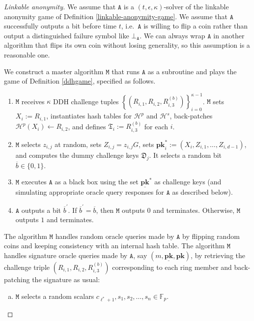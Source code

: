 \documentclass[draft]{llncs} %
\begin{document}
\begin{proof}[Linkable anonymity]
We assume that $\texttt{A}$ is a $(t, \epsilon, \kappa)$-solver of the linkable anonymity game of Definition \ref{linkable-anonymity-game}. We assume that $\texttt{A}$ successfully outputs a bit before time $t$, i.e.\ $\texttt{A}$ is willing to flip a coin rather than output a distinguished failure symbol like $\bot_{\texttt{A}}$. We can always wrap $\texttt{A}$ in another algorithm that flips its own coin without losing generality, so this assumption is a reasonable one.

We construct a master algorithm $\texttt{M}$ that runs $\texttt{A}$ as a subroutine and plays the game of Definition \ref{ddhgame}, specified as follows.

\begin{enumerate}
\item $\texttt{M}$ receives $\kappa$ DDH challenge tuples $\left\{(R_{i,1}, R_{i,2}, R_{i,3}^{(b)})\right\}_{i=0}^{\kappa - 1}$. $\texttt{M}$ sets $X_i := R_{i,1}$, instantiates hash tables for $\mathcal{H}^p$ and $\mathcal{H}^s$, back-patches $\mathcal{H}^p(X_i) \leftarrow R_{i,2}$, and defines $\mathfrak{T}_{i} := R_{i, 3}^{(b)}$ for each $i$.

\item $\texttt{M}$ selects $z_{i,j}$ at random, sets $Z_{i,j} = z_{i,j} G$, sets $\textbf{pk}_i^* := (X_i, Z_{i,1}, \ldots, Z_{i,d-1})$, and computes the dummy challenge keys $\mathfrak{D}_j$. It selects a random bit $\overline{b} \in \{0,1\}$.

\item $\texttt{M}$ executes $\texttt{A}$ as a black box using the set $\underline{\textbf{pk}}^*$ as challenge keys (and simulating appropriate oracle query responses for $\texttt{A}$ as described below).

\item $\texttt{A}$ outputs a bit $\overline{b}^\prime$. If $\overline{b}^\prime = \overline{b}$, then $\texttt{M}$ outputs $0$ and terminates. Otherwise, $\texttt{M}$ outputs $1$ and terminates.

\end{enumerate}


The algorithm $\texttt{M}$ handles random oracle queries made by $\texttt{A}$ by flipping random coins and keeping consistency with an internal hash table. The algorithm $\texttt{M}$ handles signature oracle queries made by $\texttt{A}$, say $(m, \underline{\textbf{pk}}, \textbf{pk})$, by retrieving the challenge triple $(R_{i, 1}, R_{i, 2}, R_{i, 3}^{(b)})$ corresponding to each ring member and back-patching the signature as usual:
\begin{enumerate}[(a)]
\item $\texttt{M}$ selects a random scalars $c_{\ell^*+1}, s_1, s_2, \ldots, s_n \in \mathbb{F}_p$.


\end{enumerate}
\end{proof}
\end{document}
